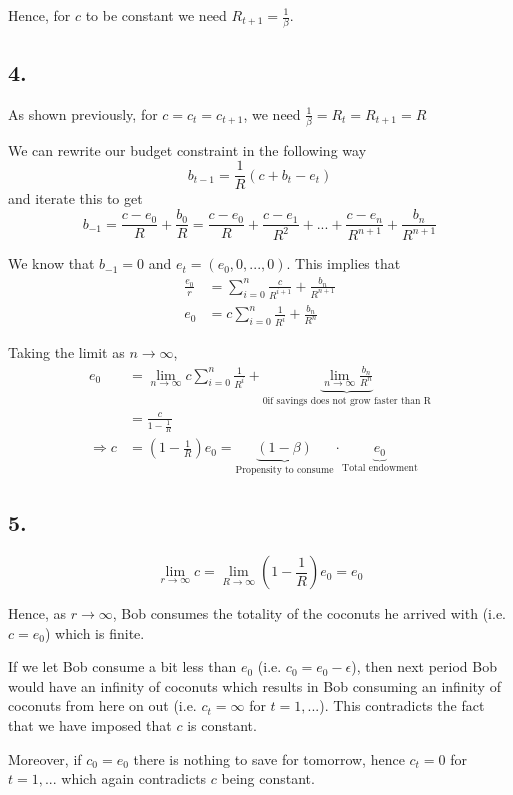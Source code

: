 \documentclass[12pt]{article}
\theoremstyle{definition}
\begin{document}
Hence, for $c$ to be constant we need $R_{t+1}=\frac{1}{\beta}$.
\subsection*{4.}

As shown previously, for $c=c_t=c_{t+1}$, we need $\frac{1}{\beta}=R_t=R_{t+1}=R$

We can rewrite our budget constraint in the following way
\[
b_{t-1}=\frac{1}{R}(c+b_t-e_t)
\]
and iterate this to get
\[
b_{-1}=\frac{c-e_0}{R}+\frac{b_0}{R}= \frac{c-e_0}{R} + \frac{c-e_1}{R^2} +...+\frac{c-e_{n}}{R^{n+1}} +\frac{b_n}{R^{n+1}}
\]

We know that $b_{-1}=0$ and $e_t=(e_0,0,...,0)$. This implies that 
\[
\begin{split}
\frac{e_0}{r} & = \sum_{i=0}^n\frac{c}{R^{i+1}} +\frac{b_n}{R^{n+1}}\\
e_0& = c \sum_{i=0}^n\frac{1}{R^{i}} +\frac{b_n}{R^{n}}
\end{split}
\]

Taking the limit as $n\to \infty$,
\[
\begin{split}
e_0& = \lim_{n\to \infty } c \sum_{i=0}^n\frac{1}{R^{i}} + \underbrace{\lim_{n\to \infty } \frac{b_n}{R^{n}}}_{0 \text{if savings does not grow faster than R}}\\
 & = \frac{c}{1-\frac{1}{R}}\\
\Rightarrow c & = (1-\frac{1}{R})e_0 = \underbrace{(1-\beta)}_{\text{Propensity to consume}} \cdot \underbrace{e_0}_{\text{Total endowment}} 
\end{split}
\]


\subsection*{5.}

\[
\lim_{r\to \infty } c  = \lim_{R\to \infty } (1-\frac{1}{R})e_0 = e_0
\]

Hence, as $r\to \infty$, Bob consumes the totality of the coconuts he arrived with (i.e. $c=e_0$) which is finite. 

If we let Bob consume a bit less than $e_0$ (i.e. $c_0=e_0-\epsilon$), then next period Bob would have an infinity of coconuts which results in Bob consuming an infinity of coconuts from here on out (i.e. $c_t=\infty$ for $t=1,...$). This contradicts the fact that we have imposed that $c$ is constant. 

Moreover, if $c_0=e_0$ there is nothing to save for tomorrow, hence $c_t=0$ for $t=1,...$ which again contradicts $c$ being constant. 
\end{document}
